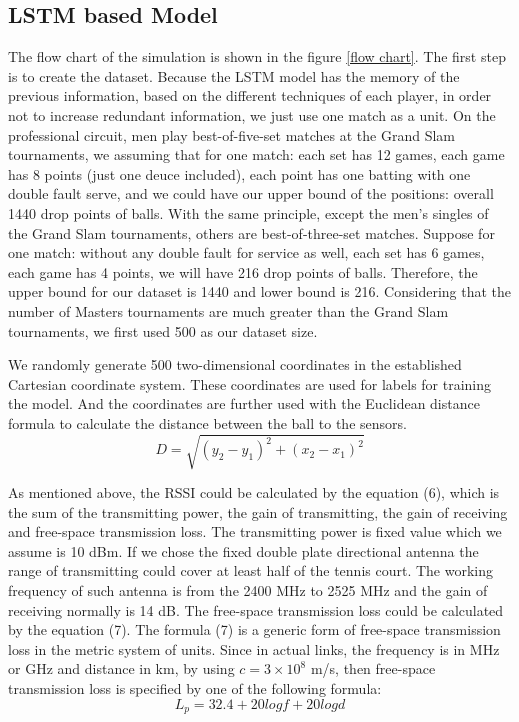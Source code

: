 \subsection{LSTM based Model}
The flow chart of the simulation is shown in the figure \ref{flow chart}. The first step is to create the dataset. Because the LSTM model has the memory of the previous information, based on the different techniques of each player, in order not to increase redundant information, we just use one match as a unit. On the professional circuit, men play best-of-five-set matches at the Grand Slam tournaments, we assuming that for one match: each set has 12 games, each game has 8 points (just one deuce included), each point has one batting with one double fault serve, and we could have our upper bound of the positions: overall 1440 drop points of balls. With the same principle, except the men's singles of the Grand Slam tournaments, others are best-of-three-set matches. Suppose for one match: without any double fault for service as well, each set has 6 games, each game has 4 points, we will have 216 drop points of balls. Therefore, the upper bound for our dataset is 1440 and lower bound is 216. Considering that the number of Masters tournaments are much greater than the Grand Slam tournaments, we first used 500 as our dataset size.

We randomly generate 500 two-dimensional coordinates in the established Cartesian coordinate system. These coordinates are used for labels for training the model. And the coordinates are further used with the Euclidean distance formula to calculate the distance between the ball to the sensors.\\
\begin{equation}
    D = \sqrt{(y_2-y_1)^2+(x_2-x_1)^2}
\end{equation}

As mentioned above, the RSSI could be calculated by the equation (6), which is the sum of the transmitting power, the gain of transmitting, the gain of receiving and free-space transmission loss. The transmitting power is fixed value which we assume is 10 dBm. If we chose the fixed double plate directional antenna the range of transmitting could cover at least half of the tennis court. The working frequency of such antenna is from the 2400 MHz to 2525 MHz and the gain of receiving normally is 14 dB. The free-space transmission loss could be calculated by the equation (7). The formula (7) is a generic form of free-space transmission loss in the metric system of units. Since in actual links, the frequency is in MHz or GHz and distance in km, by using $c = 3 \times 10^8$ m/s, then free-space transmission loss is specified by one of the following formula:\\
\begin{equation}
    L_p = 32.4 + 20 log f + 20 log d
\end{equation}

